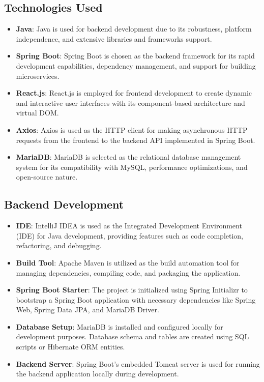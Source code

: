 \documentclass[a4paper, 12pt]{report}
\begin{document}
\subsection{Technologies Used}
\begin{itemize}
  \item \textbf{Java}: Java is used for backend development due to its robustness, platform independence, and extensive libraries and frameworks support.
  \item \textbf{Spring Boot}: Spring Boot is chosen as the backend framework for its rapid development capabilities, dependency management, and support for building microservices.
  \item \textbf{React.js}: React.js is employed for frontend development to create dynamic and interactive user interfaces with its component-based architecture and virtual DOM.
  \item \textbf{Axios}: Axios is used as the HTTP client for making asynchronous HTTP requests from the frontend to the backend API implemented in Spring Boot.
  \item \textbf{MariaDB}: MariaDB is selected as the relational database management system for its compatibility with MySQL, performance optimizations, and open-source nature.
\end{itemize}
\subsection{Backend Development}
\begin{itemize}
  \item \textbf{IDE}: IntelliJ IDEA is used as the Integrated Development Environment (IDE) for Java development, providing features such as code completion, refactoring, and debugging.
  \item \textbf{Build Tool}: Apache Maven is utilized as the build automation tool for managing dependencies, compiling code, and packaging the application.
  \item \textbf{Spring Boot Starter}: The project is initialized using Spring Initializr to bootstrap a Spring Boot application with necessary dependencies like Spring Web, Spring Data JPA, and MariaDB Driver.
  \item \textbf{Database Setup}: MariaDB is installed and configured locally for development purposes. Database schema and tables are created using SQL scripts or Hibernate ORM entities.
  \item \textbf{Backend Server}: Spring Boot's embedded Tomcat server is used for running the backend application locally during development.
\end{itemize}
\end{document}
